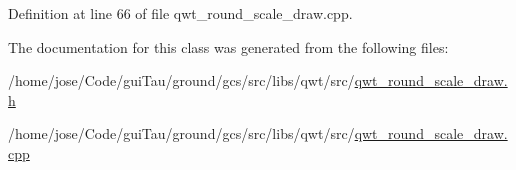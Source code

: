 Definition at line 66 of file qwt\-\_\-round\-\_\-scale\-\_\-draw.\-cpp.



The documentation for this class was generated from the following files\-:\begin{DoxyCompactItemize}
\item 
/home/jose/\-Code/gui\-Tau/ground/gcs/src/libs/qwt/src/\hyperlink{qwt__round__scale__draw_8h}{qwt\-\_\-round\-\_\-scale\-\_\-draw.\-h}\item 
/home/jose/\-Code/gui\-Tau/ground/gcs/src/libs/qwt/src/\hyperlink{qwt__round__scale__draw_8cpp}{qwt\-\_\-round\-\_\-scale\-\_\-draw.\-cpp}\end{DoxyCompactItemize}
